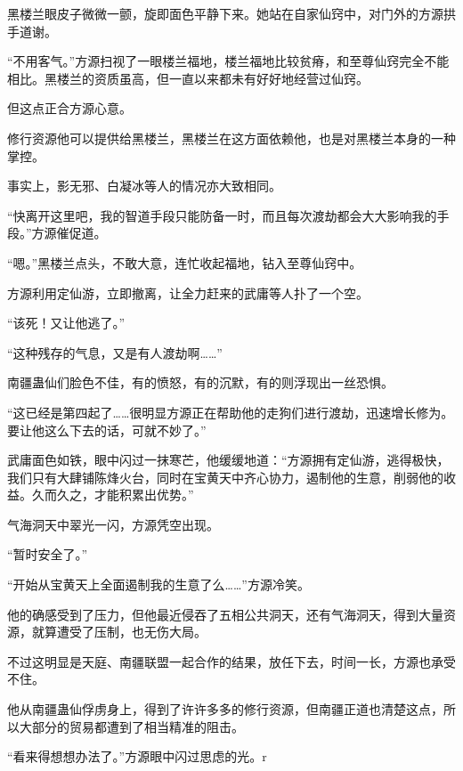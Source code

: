 \begin{this_body}
黑楼兰眼皮子微微一颤，旋即面色平静下来。她站在自家仙窍中，对门外的方源拱手道谢。

“不用客气。”方源扫视了一眼楼兰福地，楼兰福地比较贫瘠，和至尊仙窍完全不能相比。黑楼兰的资质虽高，但一直以来都未有好好地经营过仙窍。

但这点正合方源心意。

修行资源他可以提供给黑楼兰，黑楼兰在这方面依赖他，也是对黑楼兰本身的一种掌控。

事实上，影无邪、白凝冰等人的情况亦大致相同。

“快离开这里吧，我的智道手段只能防备一时，而且每次渡劫都会大大影响我的手段。”方源催促道。

“嗯。”黑楼兰点头，不敢大意，连忙收起福地，钻入至尊仙窍中。

方源利用定仙游，立即撤离，让全力赶来的武庸等人扑了一个空。

“该死！又让他逃了。”

“这种残存的气息，又是有人渡劫啊……”

南疆蛊仙们脸色不佳，有的愤怒，有的沉默，有的则浮现出一丝恐惧。

“这已经是第四起了……很明显方源正在帮助他的走狗们进行渡劫，迅速增长修为。要让他这么下去的话，可就不妙了。”

武庸面色如铁，眼中闪过一抹寒芒，他缓缓地道：“方源拥有定仙游，逃得极快，我们只有大肆铺陈烽火台，同时在宝黄天中齐心协力，遏制他的生意，削弱他的收益。久而久之，才能积累出优势。”

气海洞天中翠光一闪，方源凭空出现。

“暂时安全了。”

“开始从宝黄天上全面遏制我的生意了么……”方源冷笑。

他的确感受到了压力，但他最近侵吞了五相公共洞天，还有气海洞天，得到大量资源，就算遭受了压制，也无伤大局。

不过这明显是天庭、南疆联盟一起合作的结果，放任下去，时间一长，方源也承受不住。

他从南疆蛊仙俘虏身上，得到了许许多多的修行资源，但南疆正道也清楚这点，所以大部分的贸易都遭到了相当精准的阻击。

“看来得想想办法了。”方源眼中闪过思虑的光。r

\end{this_body}

